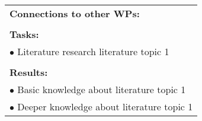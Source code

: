 \begin{table}[!h]
\begin{center}
\begin{tabular}{|p{}||p{}|p{}||p{}|}
            \multicolumn{4}{|p{.95\columnwidth}|}{\textbf{Connections to other WPs:}}\\
            \multicolumn{4}{|p{.95\columnwidth}|}{}\\
            \multicolumn{4}{|p{.95\columnwidth}|}{\textbf{Tasks:}}\\
            \multicolumn{4}{|p{.95\columnwidth}|}{$\bullet$ Literature research literature topic 1}\\
            \multicolumn{4}{|p{.95\columnwidth}|}{}\\
            \multicolumn{4}{|p{.95\columnwidth}|}{\textbf{Results:}}\\
            \multicolumn{4}{|p{.95\columnwidth}|}{$\bullet$ Basic knowledge about literature topic 1}\\
            \multicolumn{4}{|p{.95\columnwidth}|}{$\bullet$ Deeper knowledge about literature topic 1}\\
            \hline
        \end{tabular}
    \end{center}
\end{table}

\clearpage

